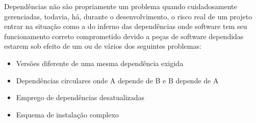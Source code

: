 
    Dependências não são propriamente um problema quando cuidadosamente gerenciadas, todavia,
    há, durante o desenvolvimento, o risco real de um projeto entrar na situação como a do
    inferno das dependências onde software tem seu funcionamento correto comprometido
    devido a peças de software dependidas estarem sob efeito de um ou de vários
    dos seguintes problemas:

    \begin{itemize}
      \item{Versões diferente de uma mesma dependência exigida}
      \item{Dependências circulares onde A depende de B e B depende de A}
      \item{Emprego de dependências desatualizadas}
      \item{Esquema de instalação complexo}
    \end{itemize}
